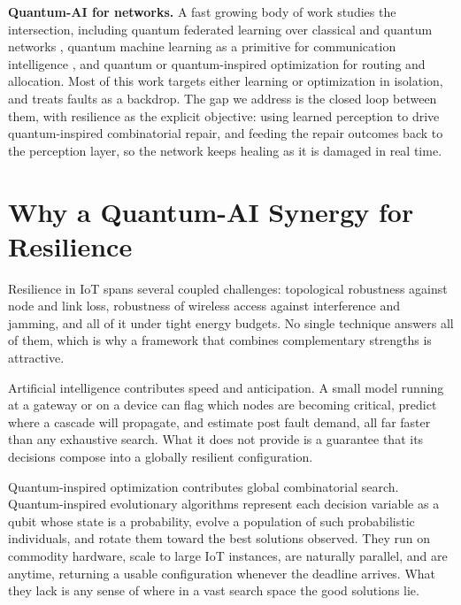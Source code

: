 \documentclass[journal]{IEEEtran}
\begin{document}
\noindent\textbf{Quantum-AI for networks.} A fast growing body of work studies the intersection, including quantum federated learning over classical and quantum networks \cite{ref12}, quantum machine learning as a primitive for communication intelligence \cite{ref8}, and quantum or quantum-inspired optimization for routing and allocation. Most of this work targets either learning or optimization in isolation, and treats faults as a backdrop. The gap we address is the closed loop between them, with resilience as the explicit objective: using learned perception to drive quantum-inspired combinatorial repair, and feeding the repair outcomes back to the perception layer, so the network keeps healing as it is damaged in real time.

\section{Why a Quantum-AI Synergy for Resilience}\label{sec:why}

Resilience in IoT spans several coupled challenges: topological robustness against node and link loss, robustness of wireless access against interference and jamming, and all of it under tight energy budgets. No single technique answers all of them, which is why a framework that combines complementary strengths is attractive.

Artificial intelligence contributes speed and anticipation. A small model running at a gateway or on a device can flag which nodes are becoming critical, predict where a cascade will propagate, and estimate post fault demand, all far faster than any exhaustive search. What it does not provide is a guarantee that its decisions compose into a globally resilient configuration.

Quantum-inspired optimization contributes global combinatorial search. Quantum-inspired evolutionary algorithms represent each decision variable as a qubit whose state is a probability, evolve a population of such probabilistic individuals, and rotate them toward the best solutions observed. They run on commodity hardware, scale to large IoT instances, are naturally parallel, and are anytime, returning a usable configuration whenever the deadline arrives. What they lack is any sense of where in a vast search space the good solutions lie.
\end{document}
